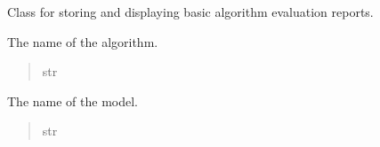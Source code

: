 \documentclass[letterpaper,10pt,english]{sphinxmanual}
\begin{document}
\begin{fulllineitems}
\label{\detokenize{modules:domain.models.BasicReport.BasicReport}}
\pysigstartsignatures
{}
\pysigstopsignatures
\sphinxAtStartPar
Class for storing and displaying basic algorithm evaluation reports.

\begin{fulllineitems}
\label{\detokenize{modules:domain.models.BasicReport.BasicReport.algorithm_name}}
\pysigstartsignatures
{}
\pysigstopsignatures
\sphinxAtStartPar
The name of the algorithm.
\begin{quote}\begin{description}
\sphinxAtStartPar
str

\end{description}\end{quote}

\end{fulllineitems}


\begin{fulllineitems}
\label{\detokenize{modules:domain.models.BasicReport.BasicReport.model}}
\pysigstartsignatures
{}
\pysigstopsignatures
\sphinxAtStartPar
The name of the model.
\begin{quote}\begin{description}
\sphinxAtStartPar
str

\end{description}\end{quote}

\end{fulllineitems}


\end{fulllineitems}
\end{document}
